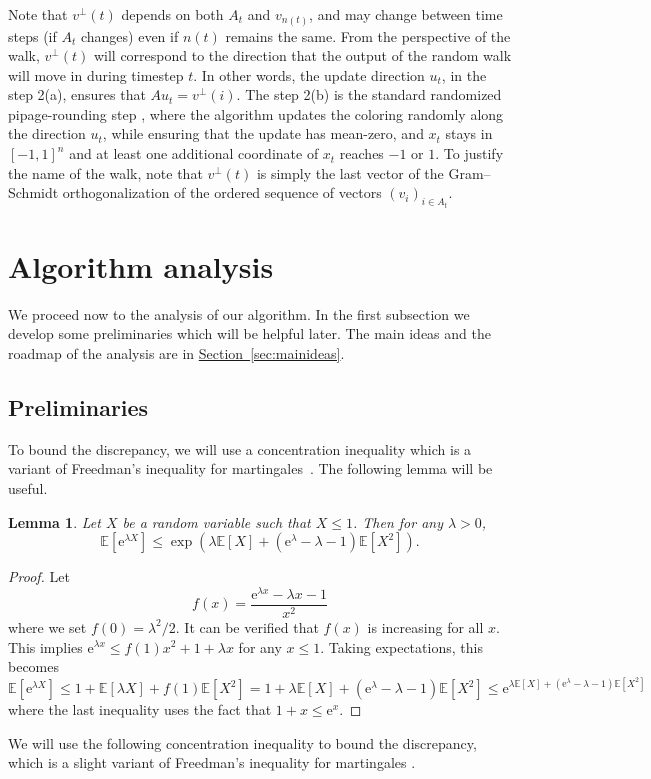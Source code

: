 \documentclass[11pt]{article}
\numberwithin{equation}{section}
\newtheorem{lemma}[theorem]{Lemma}
\theoremstyle{definition}
\theoremstyle{plain}
\newcommand{\eee}{\mathrm e}
\newcommand{\expref}[2]{\hyperref[#2]{#1~\ref{#2}}}
\newcommand\E{\mathbb{E}}
\begin{document}
Note that $v^{\perp}(t)$ depends on both $A_t$ and $v_{n(t)}$, and may change
between time steps (if $A_t$ changes) even if $n(t)$ remains the same. {}From the perspective of the
walk, $v^{\perp}(t)$ will correspond to the direction that the output of the
random walk will move in during timestep $t$. In other words, the update direction $u_t$, in the step 2(a),
ensures that $A u_t = v^{\perp}(i)$.  The step 2(b) is the standard randomized pipage-rounding step \cite{Srinivasan01,GKPS06}, where the algorithm updates the coloring randomly along the direction $u_t$, while ensuring that the update has mean-zero, and $x_t$ stays in $[-1,1]^n$ and at least one additional coordinate of $x_t$ reaches $-1$ or $1$.
To justify the name of the walk,
note that $v^\perp(t)$ is simply the last vector of the Gram--Schmidt
orthogonalization of the ordered sequence of vectors $(v_i)_{i \in A_t}$.


\section{Algorithm analysis}
\label{sec:analysis}

We proceed now to the analysis of our algorithm. In the first subsection we develop some preliminaries which will be helpful later.
The main ideas and the roadmap of the analysis are in \expref{Section}{sec:mainideas}.
\subsection{Preliminaries}
\label{sec:prel}
To bound the discrepancy, we will use a concentration inequality which is a variant of Freedman's inequality for martingales~\cite{Freedman}. The following lemma will be useful.

\begin{lemma}
\label{lem:prel1}
Let $X$ be a random variable such that $X\le 1$. Then for any $\lambda>0$,
\[ \E[\eee^{\lambda X}] \le \exp\left(\lambda \E[X] +  (\eee^{\lambda} -\lambda-1 )\E[X^2]\right).\]
\end{lemma}

\begin{proof}
  Let
  \[
    f(x) = \frac{\eee^{\lambda x} - \lambda x - 1}{x^2}
  \]
  where we set $f(0)=\lambda^2/2$. It can be verified that $f(x)$ is
  increasing for all $x$.  This implies
  $\eee^{\lambda x} \leq f(1)x^2 + 1 + \lambda x$ for any $x \le 1$.
  Taking expectations, this becomes
\[ \E[\eee^{\lambda X}] \leq  1+\E[\lambda X]+f(1)\E [X^2]
 =  1+\lambda\E[ X]+(\eee^{\lambda} -\lambda-1 )\E [X^2]
 \le   \eee^{\lambda \E [X] +(\eee^{ \lambda} -\lambda-1 )\E [X^2]} \]
where the last inequality uses the fact that $1+x\le \eee^x$.
\end{proof}
We will use the following concentration inequality to bound the discrepancy, which is a slight variant of Freedman's inequality for martingales \cite{Freedman}.
\end{document}
